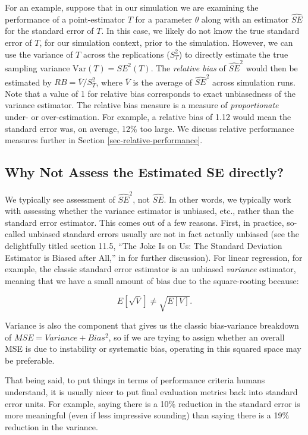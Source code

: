 \documentclass[
]{book}
\begin{document}
For an example, suppose that in our simulation we are examining the performance of a point-estimator \(T\) for a parameter \(\theta\) along with an estimator \(\widehat{SE}\) for the standard error of \(T\).
In this case, we likely do not know the true standard error of \(T\), for our simulation context, prior to the simulation.
However, we can use the variance of \(T\) across the replications (\(S_T^2\)) to directly estimate the true sampling variance \(\text{Var}(T) = SE^2(T)\).
The \emph{relative bias} of \(\widehat{SE}^2\) would then be estimated by \(RB = \bar{V} / S_T^2\), where \(\bar{V}\) is the average of \(\widehat{SE}^2\) across simulation runs.
Note that a value of 1 for relative bias corresponds to exact unbiasedness of the variance estimator.
The relative bias measure is a measure of \emph{proportionate} under- or over-estimation.
For example, a relative bias of 1.12 would mean the standard error was, on average, 12\% too large.
We discuss relative performance measures further in Section \ref{sec-relative-performance}.

\subsection{Why Not Assess the Estimated SE directly?}\label{why-not-assess-the-estimated-se-directly}

We typically see assessment of \(\widehat{SE}^2\), not \(\widehat{SE}\).
In other words, we typically work with assessing whether the variance estimator is unbiased, etc., rather than the standard error estimator.
This comes out of a few reasons.
First, in practice, so-called unbiased standard errors usually are not in fact actually unbiased (see the delightfully titled section 11.5, ``The Joke Is on Us: The Standard Deviation Estimator is Biased after All,'' in \citet{westfall2013understanding} for further discussion).
For linear regression, for example, the classic standard error estimator is an unbiased \emph{variance} estimator, meaning that we have a small amount of bias due to the square-rooting because:

\[ E[ \sqrt{ V } ] \neq \sqrt{ E[ V ] } . \]

Variance is also the component that gives us the classic bias-variance breakdown of \(MSE = Variance + Bias^2\), so if we are trying to assign whether an overall MSE is due to instability or systematic bias, operating in this squared space may be preferable.

That being said, to put things in terms of performance criteria humans understand, it is usually nicer to put final evaluation metrics back into standard error units.
For example, saying there is a 10\% reduction in the standard error is more meaningful (even if less impressive sounding) than saying there is a 19\% reduction in the variance.
\end{document}
